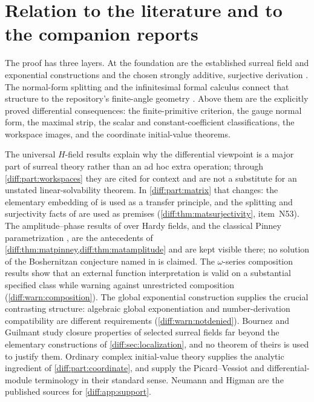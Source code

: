 \documentclass[11pt,letterpaper]{article}
\numberwithin{equation}{section}
\theoremstyle{definition}
\theoremstyle{remark}
\begin{document}
\section{Relation to the literature and to the companion reports}
\label{diff:sec:literature}

The proof has three layers. At the foundation are the established surreal
field and exponential constructions and the chosen strongly additive,
surjective derivation \cite{BM,Gonshor}. The normal-form splitting and the
infinitesimal formal calculus connect that structure to the repository's
finite-angle geometry \cite{RepoTrig}. Above them are the explicitly proved
differential consequences: the finite-primitive criterion, the gauge normal
form, the maximal strip, the scalar and constant-coefficient classifications,
the workspace images, and the coordinate initial-value theorems.

The universal $H$-field results \cite{ADH} explain why the differential
viewpoint is a major part of surreal theory rather than an ad hoc extra
operation; through \cref{diff:part:workspaces} they are cited for context and
are not a substitute for an unstated linear-solvability theorem. In
\cref{diff:part:matrix} that changes: the elementary embedding of \cite{ADH}
is used as a transfer principle, and the splitting and surjectivity facts of
\cite[Lemma 2.4.19]{ADHNorm} are used as premises
(\cref{diff:thm:matsurjectivity}, item~N53). The amplitude--phase results of
\cite{ADHSecond} over Hardy fields, and the classical Pinney parametrization
\cite{Pinney}, are the antecedents of
\cref{diff:thm:matpinney,diff:thm:matamplitude} and are kept visible there; no
solution of the Boshernitzan conjecture named in \cite{ADHSecond} is claimed.
The $\omega$-series composition results
\cite{BMGerms} show that an external function interpretation is valid on a
substantial specified class while warning against unrestricted composition
(\cref{diff:warn:composition}). The global exponential construction \cite{EK}
supplies the crucial contrasting structure: algebraic global exponentiation
and number-derivation compatibility are different requirements
(\cref{diff:warn:notdenied}). Bournez and Guilmant \cite{BG} study closure
properties of selected surreal fields far beyond the elementary constructions
of \cref{diff:sec:localization}, and no theorem of theirs is used to justify
them. Ordinary complex initial-value theory \cite{Teschl} supplies the
analytic ingredient of \cref{diff:part:coordinate}, and
\cite{PS,Singer} supply the Picard--Vessiot and differential-module
terminology in their standard sense. Neumann \cite{Neumann} and Higman
\cite{Higman} are the published sources for \cref{diff:app:support}.
\end{document}
